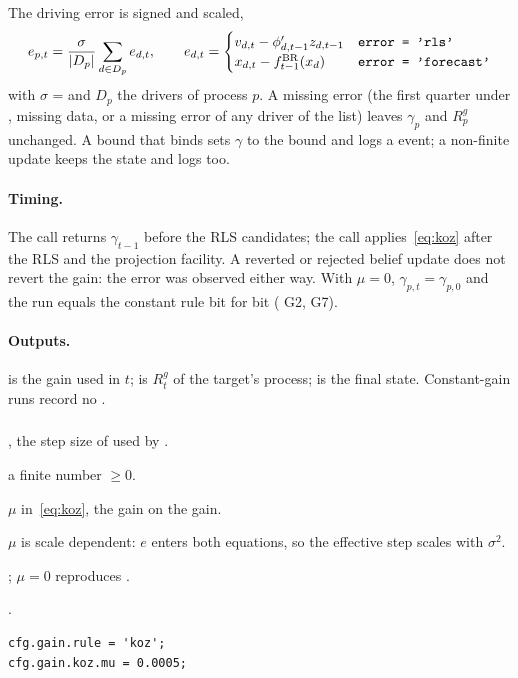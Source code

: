 \documentclass[11pt,a4paper]{article}
\DeclareRobustCommand{\codem}[1]{\texttt{\detokenize{#1}}}
\newenvironment{optspec}%
  {\begin{description}[style=sameline,leftmargin=2.7cm,labelwidth=2.5cm,font=\normalfont\itshape]}%
  {\end{description}}
\newcommand{\BR}{\mathrm{BR}}
\newcommand{\fBR}{f^{\BR}}
\newcommand{\transp}{^{\prime}}
\begin{document}
The driving error is signed and scaled,
\begin{equation}\label{eq:kozerr}
  e_{p,t} = \frac{\sigma}{|D_p|}\sum_{d\in D_p} e_{d,t},\qquad
  e_{d,t} =
  \begin{cases}
    v_{d,t} - \phi_{d,t-1}\transp z_{d,t-1} & \text{\codem{error = 'rls'}}\\
    x_{d,t} - \fBR_{t-1}(x_d) & \text{\codem{error = 'forecast'}}
  \end{cases}
\end{equation}
with $\sigma$ =  and $D_p$ the drivers of process $p$. A missing error
(the first quarter under , missing data, or a missing error of any driver of the
list) leaves $\gamma_p$ and $R^g_p$ unchanged. A bound that binds sets $\gamma$ to the bound and logs
a  event; a non-finite update keeps the state and logs  too.

\paragraph{Timing.} The  call returns $\gamma_{t-1}$ before the RLS candidates; the
 call applies~\eqref{eq:koz} after the RLS and the projection facility. A reverted
or rejected belief update does not revert the gain: the error was observed either way. With
$\mu = 0$, $\gamma_{p,t} = \gamma_{p,0}$ and the run equals the constant rule bit for bit
( G2, G7).

\paragraph{Outputs.}  is the gain used in $t$;
 is $R^g_t$ of the target's process;  is the final state.
Constant-gain runs record no .

\subsubsection{\texorpdfstring{\codem{gain.koz.mu}}{gain.koz.mu}}\label{opt:gain-koz-mu}
\begin{optspec}
  \item[Default] , the step size of \citet{kostyshyna2012} used by \citet{koz2024}.
  \item[Values] a finite number $\ge 0$.
  \item[Math] $\mu$ in~\eqref{eq:koz}, the gain on the gain.
  \item[Assumptions] $\mu$ is scale dependent: $e$ enters both equations, so the effective step
        scales with $\sigma^2$.
  \item[Interactions] ; $\mu=0$ reproduces .
  \item[Code] .
  \item[Example]
\begin{lstlisting}
cfg.gain.rule = 'koz';
cfg.gain.koz.mu = 0.0005;
\end{lstlisting}
\end{optspec}
\end{document}
